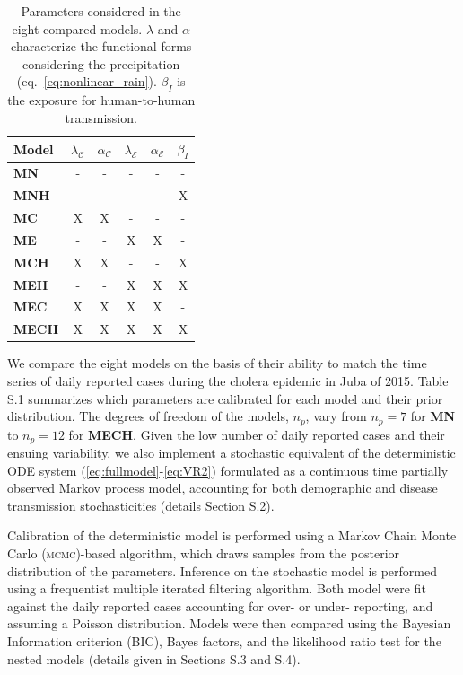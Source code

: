 \begin{table}[h!]
\centering
\begin{tabular}{lccccc}
\toprule
     Model       & $\lambda_{\mathcal{C}}$ & $\alpha_\mathcal{C}$ & $\lambda_{\mathcal{E}}$ & $\alpha_\mathcal{E}$ & $\beta_I$   \\
    \hline
    \textbf{MN} &       -    &    -   &       -      &       -      &  - \\
    \textbf{MNH} &     -      &   -    &    -         &        -     &   X\\
    \textbf{MC} &       X   &   X   &     -        &       -      &  - \\
    \textbf{ME} &         -  &   -    &       X     &    X         & -  \\
    \textbf{MCH}&       X   &   X   &      -       &     -        & X  \\
    \textbf{MEH}&        -   &  -     &       X     &    X         & X  \\
    \textbf{MEC}&       X  &   X   &       X     &     X       & -\\
    \textbf{MECH}&       X  &   X   &       X     &     X        &   X\\
\bottomrule
\end{tabular}
\caption{Parameters considered in the eight compared models.  $\lambda$ and $\alpha$ characterize the functional forms considering the precipitation (eq.~\ref{eq:nonlinear_rain}). $\beta_I$ is the exposure for human-to-human transmission.}
\label{tab:models}
\end{table}

We compare the eight models on the basis of their ability to match the time series of daily reported cases during the cholera epidemic in Juba of 2015. Table S.1 summarizes which parameters are calibrated for each model and their prior distribution. The degrees of freedom of the models, $n_p$, vary from $n_p=7$ for \textbf{MN} to $n_p=12$ for \textbf{MECH}. Given the low number of daily reported cases and their ensuing variability, we also implement a stochastic equivalent of the deterministic ODE system (\ref{eq:fullmodel}-\ref{eq:VR2}) formulated as a continuous time partially observed Markov process model, accounting for both demographic and disease transmission stochasticities\cite{Breto:TimeSeriesAnalysis:2009} (details Section S.2). 

Calibration of the deterministic model is performed using a Markov Chain Monte Carlo (\textsc{mcmc})-based algorithm, which draws samples from the posterior distribution of the parameters. Inference on the stochastic model is performed using a frequentist multiple iterated filtering algorithm. Both model were fit against the daily reported cases accounting for over- or under- reporting, and assuming a Poisson distribution. Models were then compared using the Bayesian Information criterion (BIC), Bayes factors, and the likelihood ratio test for the nested models (details given in Sections S.3 and S.4).

